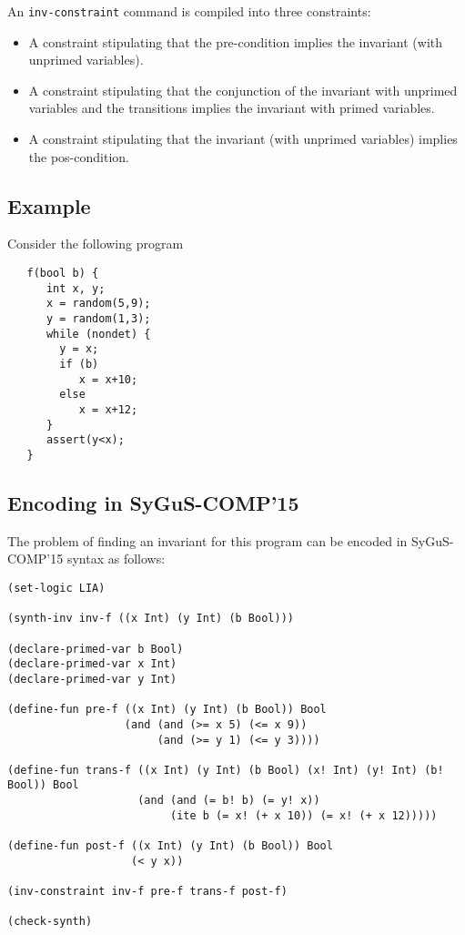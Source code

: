 \documentclass{llncs}
\begin{document}
\vspace{3mm}
\noindent
An \texttt{inv-constraint} command is compiled into three constraints: 
\vspace{-3mm}
\begin{itemize}
\item A constraint stipulating that the pre-condition implies the invariant (with unprimed variables). 
\item A constraint stipulating that the conjunction of the invariant with unprimed variables and the transitions implies the invariant with primed variables.
\item A constraint stipulating that the invariant (with unprimed variables) implies the pos-condition. 
\end{itemize}




\subsection*{Example}
Consider the following program
\begin{verbatim}
   f(bool b) {
      int x, y;
      x = random(5,9);
      y = random(1,3);
      while (nondet) {
        y = x;    	
        if (b) 
           x = x+10;
        else 
           x = x+12;
      }
      assert(y<x);
   }
\end{verbatim}

\subsection*{Encoding in SyGuS-COMP'15}
The problem of finding an invariant for this program can be encoded in SyGuS-COMP'15 syntax as follows: 
\begin{verbatim}
(set-logic LIA)

(synth-inv inv-f ((x Int) (y Int) (b Bool)))

(declare-primed-var b Bool)
(declare-primed-var x Int)
(declare-primed-var y Int)

(define-fun pre-f ((x Int) (y Int) (b Bool)) Bool
                  (and (and (>= x 5) (<= x 9))
                       (and (>= y 1) (<= y 3))))
                       
(define-fun trans-f ((x Int) (y Int) (b Bool) (x! Int) (y! Int) (b! Bool)) Bool
                    (and (and (= b! b) (= y! x)) 
                         (ite b (= x! (+ x 10)) (= x! (+ x 12)))))
                         
(define-fun post-f ((x Int) (y Int) (b Bool)) Bool
                   (< y x))

(inv-constraint inv-f pre-f trans-f post-f)

(check-synth)
\end{verbatim}
\end{document}
